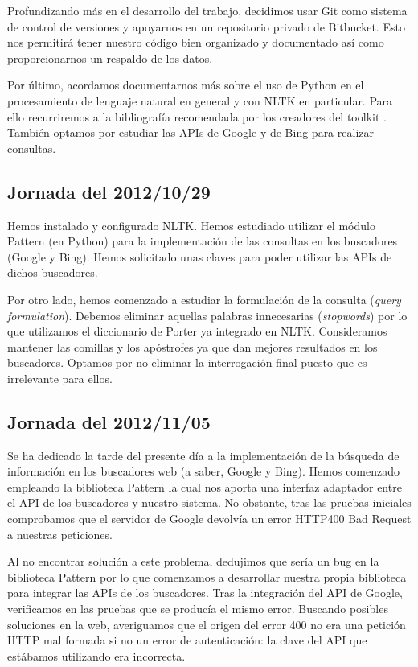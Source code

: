 \documentclass[12pt,a4paper,titlepage]{article}
\begin{document}
Profundizando más en el desarrollo del trabajo, decidimos usar Git como sistema de control de versiones y apoyarnos en un repositorio privado de Bitbucket. Esto nos permitirá tener nuestro código bien organizado y documentado así como proporcionarnos un respaldo de los datos.

Por último, acordamos documentarnos más sobre el uso de Python en el procesamiento de lenguaje natural en general y con NLTK en particular. Para ello recurriremos a la bibliografía recomendada por los creadores del toolkit \cite{nltk-book}. También optamos por estudiar las APIs de Google y de Bing para realizar consultas.

\subsection{Jornada del 2012/10/29}
Hemos instalado y configurado NLTK. Hemos estudiado utilizar el módulo Pattern (en Python) para la implementación de las consultas en los buscadores (Google y Bing). Hemos solicitado unas claves para poder utilizar las APIs de dichos buscadores.

Por otro lado, hemos comenzado a estudiar la formulación de la consulta (\emph{query formulation}). Debemos eliminar aquellas palabras innecesarias (\emph{stopwords}) por lo que utilizamos el diccionario de Porter ya integrado en NLTK. Consideramos mantener las comillas y los apóstrofes ya que dan mejores resultados en los buscadores. Optamos por no eliminar la interrogación final puesto que es irrelevante para ellos.

\subsection{Jornada del 2012/11/05}
Se ha dedicado la tarde del presente día a la implementación de la búsqueda de información en los buscadores web (a saber, Google y Bing). Hemos comenzado empleando la biblioteca Pattern\cite{pattern} la cual nos aporta una interfaz adaptador entre el API de los buscadores y nuestro sistema. No obstante, tras las pruebas iniciales comprobamos que el servidor de Google devolvía un error HTTP400 Bad Request a nuestras peticiones.

Al no encontrar solución a este problema, dedujimos que sería un bug en la biblioteca Pattern por lo que comenzamos a desarrollar nuestra propia biblioteca para integrar las APIs de los buscadores. Tras la integración del API de Google, verificamos en las pruebas que se producía el mismo error. Buscando posibles soluciones en la web, averiguamos que el origen del error 400 no era una petición HTTP mal formada si no un error de autenticación: la clave del API que estábamos utilizando era incorrecta.
\end{document}
